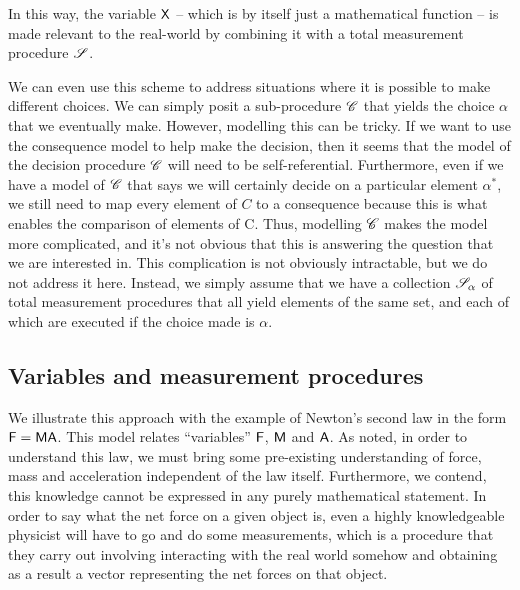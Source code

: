 In this way, the variable $\mathsf{X}$ -- which is by itself just a mathematical function -- is made relevant to the real-world by combining it with a total measurement procedure $\mathscr{S}$.

We can even use this scheme to address situations where it is possible to make different choices. We can simply posit a sub-procedure $\mathscr{C}$ that yields the choice $\alpha$ that we eventually make. However, modelling this can be tricky. If we want to use the consequence model to help make the decision, then it seems that the model of the decision procedure $\mathscr{C}$ will need to be self-referential. Furthermore, even if we have a model of $\mathscr{C}$ that says we will certainly decide on a particular element $\alpha^*$, we still need to map every element of $C$ to a consequence because this is what enables the comparison of elements of C. Thus, modelling $\mathscr{C}$ makes the model more complicated, and it's not obvious that this is answering the question that we are interested in. This complication is not obviously intractable, but we do not address it here. Instead, we simply assume that we have a collection $\mathscr{S}_\alpha$ of total measurement procedures that all yield elements of the same set, and each of which are executed if the choice made is $\alpha$.

\subsection{Variables and measurement procedures}

We illustrate this approach with the example of Newton's second law in the form $\mathsf{F}=\mathsf{MA}$. This model relates ``variables'' $\mathsf{F}$, $\mathsf{M}$ and $\mathsf{A}$. As \citet{feynman_feynman_1979} noted, in order to understand this law, we must bring some pre-existing understanding of force, mass and acceleration independent of the law itself. Furthermore, we contend, this knowledge cannot be expressed in any purely mathematical statement. In order to say what the net force on a given object is, even a highly knowledgeable physicist will have to go and do some measurements, which is a procedure that they carry out involving interacting with the real world somehow and obtaining as a result a vector representing the net forces on that object.


